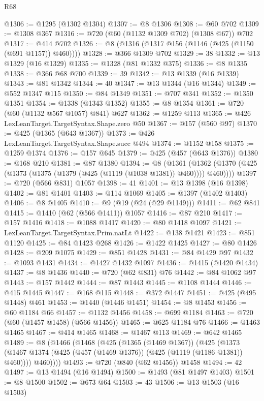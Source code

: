 \begin{lexlean}{R68}
\begin{coremodule}
@1306 := @1295 (@1302 @1304)
@1307 := @8 @1306
@1308 := @60 @702
@1309 := @1308 @367
@1316 := @720 (@60 (@1132 @1309 @702) (@1308 @67)) @702
@1317 := @414 @702
@1326 := @8 (@1316 (@1317 @156 (@1146 (@425 (@1150 (@691 @1157)) @460))))
@1328 := @366 @1309 @702
@1329 := 38
@1332 := @13 @1329 (@16 @1329)
@1335 := @1328 (@81 @1332 @375)
@1336 := @8 @1335
@1338 := @366 @68 @700
@1339 := 39
@1342 := @13 @1339 (@16 @1339)
@1343 := @81 @1342
@1344 := 40
@1347 := @13 @1344 (@16 @1344)
@1349 := @552 @1347 @115
@1350 := @84 @1349
@1351 := @707 @341
@1352 := @1350 @1351
@1354 := @1338 (@1343 @1352)
@1355 := @8 @1354
@1361 := @720 (@60 (@1132 @567 @1057) @841) @627
@1362 := @1259 @113
@1365 := @426 LexLeanTarget.TargetSyntax.Shape.zero @50
@1367 := @157 (@560 @97)
@1370 := @425 (@1365 (@643 @1367))
@1373 := @426 LexLeanTarget.TargetSyntax.Shape.succ @494
@1374 := @1152 @158
@1375 := @1259 @1374
@1376 := @157 @645
@1379 := @425 (@457 (@643 @1376))
@1380 := @168 @210
@1381 := @87 @1380
@1394 := @8
    (@1361 (@1362 (@1370 (@425 (@1373 (@1375 (@1379 (@425 (@1119 (@1038 @1381)) @460)))) @460))))
@1397 := @720 (@566 @831) @1057
@1398 := 41
@1401 := @13 @1398 (@16 @1398)
@1402 := @81 @1401
@1403 := @114 @1069
@1405 := @1397 (@1402 @1403)
@1406 := @8 @1405
@1410 := @9 (@19 (@24 (@29 @1149)))
@1411 := @62 @841
@1415 := @1410 (@62 (@566 @1411)) @1057
@1416 := @87 @210
@1417 := @157 @1416
@1418 := @1088 @1417
@1420 := @80 @1418 @1097
@1421 := LexLeanTarget.TargetSyntax.Prim.natLt
@1422 := @138 @1421
@1423 := @851 @1120
@1425 := @84 @1423 @268
@1426 := @1422 @1425
@1427 := @80 @1426
@1428 := @209 @1075
@1429 := @851 @1428
@1431 := @84 @1429 @97
@1432 := @1093 @1431
@1434 := @1427 @1432 @1097
@1436 := @1415 (@1420 @1434)
@1437 := @8 @1436
@1440 := @720 (@62 @831) @76
@1442 := @84 @1062 @97
@1443 := @157 @1442
@1444 := @87 @1443
@1445 := @1108 @1444
@1446 := @415 @1445
@1447 := @168 @115
@1448 := @372 @1447
@1451 := @425 (@495 @1448) @461
@1453 := @1440 (@1446 @1451)
@1454 := @8 @1453
@1456 := @60 @1184 @66
@1457 := @1132 @1456
@1458 := @699 @1184
@1463 := @720 (@60 (@1457 @1458) (@566 @1456))
@1465 := @625 @1184 @76
@1466 := @1463 @1465
@1467 := @414 @1465
@1468 := @1467 @113
@1469 := @642 @1465
@1489 := @8
    (@1466
      (@1468
        (@425
          (@1365 (@1469 @1367))
          (@425
            (@1373 (@1467 @1374 (@425 (@457 (@1469 @1376)) (@425 (@1119 (@1186 @1381)) @460))))
            @460))))
@1493 := @720 (@840 (@62 @1456)) @1458
@1494 := 42
@1497 := @13 @1494 (@16 @1494)
@1500 := @1493 (@81 @1497 @1403)
@1501 := @8 @1500
@1502 := @673 @64
@1503 := 43
@1506 := @13 @1503 (@16 @1503)

\end{coremodule}
\end{lexlean}
